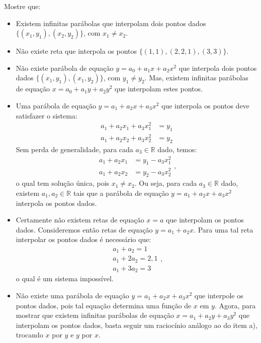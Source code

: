 \begin{exeresol}\label{exeresol:problemas_mal_determinados}
  Mostre que:
  \begin{itemize}
  \item[a)] Existem infinitas parábolas que interpolam dois pontos dados $\{(x_1, y_1), (x_2, y_2)\}$, com $x_1 \neq x_2$.
  \item[b)] Não existe reta que interpola os pontos $\{(1, 1), (2, 2,1), (3, 3)\}$.
  \item[c)] Não existe parábola de equação $y = a_0 + a_1x + a_2x^2$ que interpola dois pontos dados $\{(x_1, y_1), (x_1, y_2)\}$, com $y_1 \neq y_2$. Mas, existem infinitas parábolas de equação $x = a_0 + a_1y + a_2y^2$ que interpolam estes pontos.
  \end{itemize}
\end{exeresol}
\begin{resol}
  \begin{itemize}
  \item[a)] Uma parábola de equação $y = a_1 + a_2x + a_3x^2$ que interpola os pontos deve satisfazer o sistema:
    \begin{equation}
      \begin{split}
        a_1 + a_2x_1 + a_3x_1^2 &= y_1\\
        a_1 + a_2x_2 + a_3x_2^2 &= y_2
      \end{split}
    \end{equation}
    Sem perda de generalidade, para cada $a_3\in\mathbb{R}$ dado, temos:
    \begin{equation}
      \begin{split}
        a_1 + a_2x_1  &= y_1 - a_3x_1^2\\
        a_1 + a_2x_2  &= y_2 - a_3x_2^2
      \end{split},
    \end{equation}
    o qual tem solução única, pois $x_1\neq x_2$. Ou seja, para cada $a_3\in\mathbb{R}$ dado, existem $a_1, a_2\in\mathbb{R}$ tais que a parábola de equação $y = a_1 + a_2x + a_3x^2$ interpola os pontos dados.
  \item[b)] Certamente não existem retas de equação $x = a$ que interpolam os pontos dados. Consideremos então retas de equação $y = a_1 + a_2x$. Para uma tal reta interpolar os pontos dados é necessário que:
    \begin{equation}
      \begin{split}
        a_1 + a_2 = 1\\
        a_1 + 2a_2 = 2,1\\
        a_1 + 3a_2 = 3
      \end{split},
    \end{equation}
    o qual é um sistema impossível.
  \item[c)] Não existe uma parábola de equação $y = a_1 + a_2x + a_3x^2$ que interpole os pontos dados, pois tal equação determina uma função de $x$ em $y$. Agora, para mostrar que existem infinitas parábolas de equação $x = a_1 + a_2y + a_3y^2$ que interpolam os pontos dados, basta seguir um raciocínio análogo ao do item a), trocando $x$ por $y$ e $y$ por $x$.
  \end{itemize}
\end{resol}

